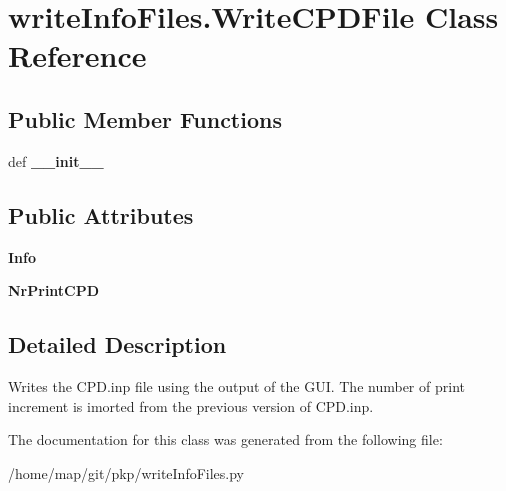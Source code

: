 \hypertarget{classwriteInfoFiles_1_1WriteCPDFile}{\section{write\-Info\-Files.\-Write\-C\-P\-D\-File \-Class \-Reference}
\label{classwriteInfoFiles_1_1WriteCPDFile}
}
\subsection*{\-Public \-Member \-Functions}
\begin{DoxyCompactItemize}
\item 
\hypertarget{classwriteInfoFiles_1_1WriteCPDFile_a96011af784c1d7380cb4a561ce95fe0c}{def {\bfseries \-\_\-\-\_\-init\-\_\-\-\_\-}}\label{classwriteInfoFiles_1_1WriteCPDFile_a96011af784c1d7380cb4a561ce95fe0c}

\end{DoxyCompactItemize}
\subsection*{\-Public \-Attributes}
\begin{DoxyCompactItemize}
\item 
\hypertarget{classwriteInfoFiles_1_1WriteCPDFile_aacb24550a0916096b1cea89ce0274fa5}{{\bfseries \-Info}}\label{classwriteInfoFiles_1_1WriteCPDFile_aacb24550a0916096b1cea89ce0274fa5}

\item 
\hypertarget{classwriteInfoFiles_1_1WriteCPDFile_ab64547b891a9b834ede9925aad0ff3d9}{{\bfseries \-Nr\-Print\-C\-P\-D}}\label{classwriteInfoFiles_1_1WriteCPDFile_ab64547b891a9b834ede9925aad0ff3d9}

\end{DoxyCompactItemize}


\subsection{\-Detailed \-Description}
\begin{DoxyVerb}Writes the CPD.inp file using the output of the GUI. The number of print increment is imorted from the previous version of CPD.inp.\end{DoxyVerb}
 

\-The documentation for this class was generated from the following file\-:\begin{DoxyCompactItemize}
\item 
/home/map/git/pkp/write\-Info\-Files.\-py\end{DoxyCompactItemize}
